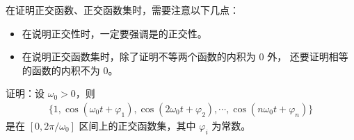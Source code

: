 \begin{note}
    在证明正交函数、正交函数集时，需要注意以下几点：
    \begin{itemize}
        \item 在说明正交性时，一定要强调是的正交性。
        \item 在说明正交函数集时，除了证明不等两个函数的内积为 $0$ 外，
            还要证明相等的函数的内积不为 $0$。
    \end{itemize}
\end{note}

\begin{exercise}
    证明：设 $\omega_0 > 0$，则
    \begin{align*}
        \{1, \cos(\omega_0t + \varphi_1), \cos(2\omega_0t + \varphi_2),
            \cdots, \cos(n\omega_0 t + \varphi_n)\}
    \end{align*}
    是在 $[0, 2\pi/\omega_0]$ 区间上的正交函数集，其中 $\varphi_i$ 为常数。
\end{exercise}

